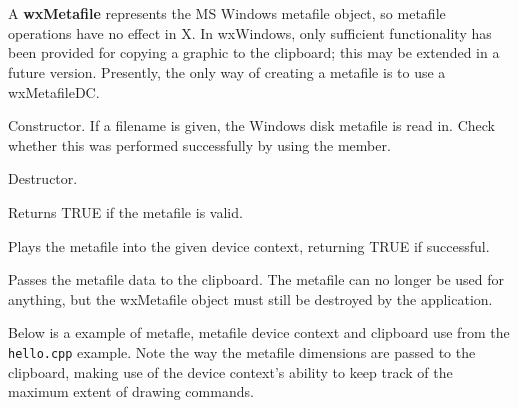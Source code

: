 \section{}\label{wxmetafile}

A {\bf wxMetafile} represents the MS Windows metafile object, so metafile
operations have no effect in X. In wxWindows, only sufficient functionality
has been provided for copying a graphic to the clipboard; this may be extended
in a future version. Presently, the only way of creating a metafile
is to use a wxMetafileDC.








Constructor. If a filename is given, the Windows disk metafile is
read in. Check whether this was performed successfully by
using the  member.



Destructor.

\label{wxmetafileok}


Returns TRUE if the metafile is valid.

\label{wxmetafileplay}


Plays the metafile into the given device context, returning
TRUE if successful.



Passes the metafile data to the clipboard. The metafile can no longer be
used for anything, but the wxMetafile object must still be destroyed by
the application.

Below is a example of metafle, metafile device context and clipboard use
from the {\tt hello.cpp} example. Note the way the metafile dimensions
are passed to the clipboard, making use of the device context's ability
to keep track of the maximum extent of drawing commands.

